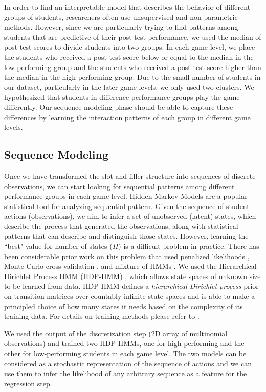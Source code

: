 \documentclass{sigchi}
\begin{document}
In order to find an interpretable model that describes the behavior of different groups of students, researchers often use unsupervised and non-parametric methods.
However, since we are particularly trying to find patterns among students that are predictive of their post-test performance, we used the median of post-test scores to divide students into two groups. 
In each game level, we place the students who received a post-test score below or equal to the median in the low-performing group and the students who received a post-test score higher than the median in the high-performing group.
Due to the small number of students in our dataset, particularly in the later game levels, we only used two clusters. 
We hypothesized that students in difference performance groups play the game differently. 
Our sequence modeling phase should be able to capture these differences by learning the interaction patterns of each group in different game levels.

\subsection{Sequence Modeling}
Once we have transformed the slot-and-filler structure into sequences of discrete observations, we can start looking for sequential patterns among different performance groups in each game level.
Hidden Markov Models are a popular statistical tool for analyzing sequential pattern. 
Given the sequence of student actions (observations), we aim to infer a set of unobserved (latent) states, which describe the process that generated the observations, along with statistical patterns that can describe and distinguish those states.
However, learning the ``best" value for number of states ($H$) is a difficult problem in practice. 
There has been considerable prior work on this problem that used penalized likelihoods \cite{rabiner1989hmm}, Monte-Carlo cross-validation \cite{smyth1996clustering}, and mixture of HMMs \cite{smyth1997clustering}.
We used the Hierarchical Dirichlet Process HMM (HDP-HMM) \cite{fox2008hdp}, which allows state spaces of unknown size to be learned from data. 
HDP-HMM defines a \textit{hierarchical Dirichlet process} prior on transition matrices over countably infinite state spaces and is able to make a principled choice of how many states it needs based on the complexity of its training data. 
For details on training methods please refer to \cite{fox2008hdp}.

We used the output of the discretization step (2D array of multinomial observations) and trained two HDP-HMMs, one for high-performing and the other for low-performing students in each game level. The two models can be considered as a stochastic representation of the sequence of actions and we can use them to infer the likelihood of any arbitrary sequence as a feature for the regression step. 
\end{document}
